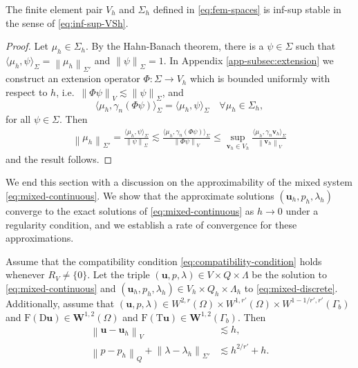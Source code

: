 \documentclass[onefignum,onetabnum]{siamart190516}
\newcommand{\bu}{\boldsymbol{u}}
\newcommand{\bv}{\boldsymbol{v}}
\newcommand{\bW}{\boldsymbol{W}}
\newcommand{\bT}{\boldsymbol{\mathrm{T}}}
\newcommand{\bD}{\boldsymbol{\mathrm{D}}}
\newcommand{\bF}{\boldsymbol{\mathrm{F}}}
\newcommand{\nrm}[1]{\left\lVert#1\right\rVert}
\begin{document}
\begin{lemma}\label{lemma:inf-sup-VSh}
	The finite element pair $V_h$ and $\Sigma_h$ defined in \eqref{eq:fem-spaces} is inf-sup stable in the sense of \eqref{eq:inf-sup-VSh}.
\end{lemma}

\begin{proof}
	Let $\mu_h\in\Sigma_h$. By the Hahn-Banach theorem, there is a $\psi\in \Sigma$ such that $\langle \mu_h, \psi\rangle_\Sigma = \nrm{\mu_h}_{\Sigma'}$ and $\nrm{\psi}_\Sigma = 1$. In Appendix \ref{app-subsec:extension} we construct an extension operator $\Phi:\Sigma \to V_h$ which is bounded uniformly with respect to $h$, i.e.~$\nrm{\Phi\psi}_V \lesssim \nrm{\psi}_\Sigma$, and
	\[
		\langle \mu_h, \gamma_n (\Phi\psi)\rangle_\Sigma = \langle \mu_h, \psi\rangle_\Sigma \quad \forall \mu_h\in \Sigma_h,
	\]
	for all $\psi \in \Sigma$. Then
	\begin{align*}
		\nrm{\mu_h}_{\Sigma'} = \frac{\langle \mu_h, \psi\rangle_\Sigma}{\nrm{\psi}_\Sigma} \lesssim \frac{\langle \mu_h, \gamma_n (\Phi\psi)\rangle_\Sigma}{\nrm{\Phi\psi}_V} \leq \sup_{\bv_h\in V_h} \frac{\langle\mu_h, \gamma_n\bv_h\rangle_\Sigma}{\nrm{\bv_h}_V}
	\end{align*}
	and the result follows.
\end{proof}

We end this section with a discussion on the approximability of the mixed system \eqref{eq:mixed-continuous}. We show that the approximate solutions $(\bu_h,p_h,\lambda_h)$ converge to the exact solutions of \eqref{eq:mixed-continuous} as $h\to 0$ under a regularity condition, and we establish a rate of convergence for these approximations. 

\begin{theorem}\label{thm:convergence}
	Assume that the compatibility condition \eqref{eq:compatibility-condition} holds whenever $R_V \neq \{0\}$. Let the triple $(\bu,p,\lambda)\in V\times Q\times \Lambda$ be the solution to \eqref{eq:mixed-continuous} and $(\bu_h,p_h,\lambda_h)\in V_h\times Q_h\times \Lambda_h$ to \eqref{eq:mixed-discrete}. Additionally, assume that $(\bu,p,\lambda)\in W^{2,r}(\Omega) \times W^{1,r'}(\Omega) \times W^{1 - 1/r',r'}(\Gamma_b)$ and $\bF(\bD\bu)\in \bW^{1,2}(\Omega)$ and $\bF(\bT\bu)\in \bW^{1,2}(\Gamma_b)$. Then
	\begin{subequations}\label{eq:error-estimate}
	\begin{align}
		\nrm{\bu - \bu_h}_V &\lesssim h, \label{eq:error-estimate-V} \\
		\nrm{p - p_h}_Q + \nrm{\lambda - \lambda_h}_{\Sigma'} &\lesssim h^{2/r'} + h . \label{eq:error-estimate-QS}
	\end{align}
	\end{subequations}

\end{theorem}
\end{document}
